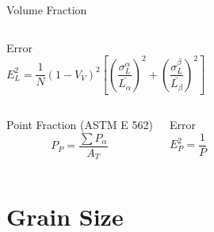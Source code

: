 \documentclass[10pt]{beamer}
\begin{document}
{\begin{frame}[fragile]{Volume Fraction}
\begin{columns}[T,onlytextwidth]

\begin{block}{Error}
\small
\begin{equation*}
E_{L}^{2} = \dfrac{1}{N}(1-V_{V})^{2}\left[ \left( \dfrac{\sigma^{\alpha}_{L}}{\bar{L_{\alpha}}} \right)^{2} + \left( \dfrac{\sigma^{\beta}_{L}}{\bar{L_{\beta}}} \right)^{2} \right]
\end{equation*}

\end{block}

\end{columns}

  \begin{columns}[T,onlytextwidth]
\begin{block}{Point Fraction (ASTM E 562)}
\begin{equation*}
P_{P} = \dfrac{\sum P_{\alpha}}{A_{T}}
\end{equation*} 
\end{block}
 

\begin{block}{Error}
\begin{equation*}
E_{P}^{2} = \dfrac{1}{P}
\end{equation*} 
\end{block}

\end{columns}


 
    
\end{frame}
}
\section{Grain Size}
\end{document}
